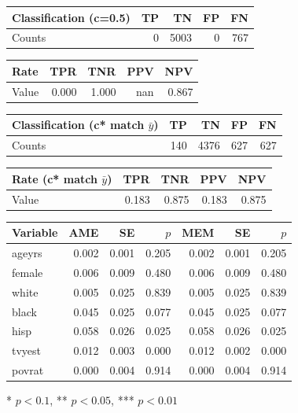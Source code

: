 \documentclass{article}
\begin{document}
\vspace{4pt}
\begin{table}[H]
\centering
\begin{tabular}{lrrrr}
\toprule
Classification (c=0.5) & TP & TN & FP & FN \\
\midrule
Counts & 0 & 5003 & 0 & 767 \\
\bottomrule
\end{tabular}
\end{table}
\begin{table}[H]
\centering
\begin{tabular}{lrrrr}
\toprule
Rate & TPR & TNR & PPV & NPV \\
\midrule
Value & 0.000 & 1.000 & nan & 0.867 \\
\bottomrule
\end{tabular}
\end{table}
\begin{table}[H]
\centering
\begin{tabular}{lrrrr}
\toprule
Classification (c* match $\bar{y}$) & TP & TN & FP & FN \\
\midrule
Counts & 140 & 4376 & 627 & 627 \\
\bottomrule
\end{tabular}
\end{table}
\begin{table}[H]
\centering
\begin{tabular}{lrrrr}
\toprule
Rate (c* match $\bar{y}$) & TPR & TNR & PPV & NPV \\
\midrule
Value & 0.183 & 0.875 & 0.183 & 0.875 \\
\bottomrule
\end{tabular}
\end{table}
\begin{table}[H]
\centering
\begin{tabular}{lrrrrrr}
\toprule
Variable & AME & SE & $p$ & MEM & SE & $p$ \\
\midrule
ageyrs & 0.002 & 0.001 & 0.205 & 0.002 & 0.001 & 0.205 \\
female & 0.006 & 0.009 & 0.480 & 0.006 & 0.009 & 0.480 \\
white & 0.005 & 0.025 & 0.839 & 0.005 & 0.025 & 0.839 \\
black & 0.045 & 0.025 & 0.077 & 0.045 & 0.025 & 0.077 \\
hisp & 0.058 & 0.026 & 0.025 & 0.058 & 0.026 & 0.025 \\
tvyest & 0.012 & 0.003 & 0.000 & 0.012 & 0.002 & 0.000 \\
povrat & 0.000 & 0.004 & 0.914 & 0.000 & 0.004 & 0.914 \\
\bottomrule
\end{tabular}
\end{table}
\vspace{2pt}
\begin{flushleft}\footnotesize{* $p<0.1$, ** $p<0.05$, *** $p<0.01$}\end{flushleft}
\end{document}
